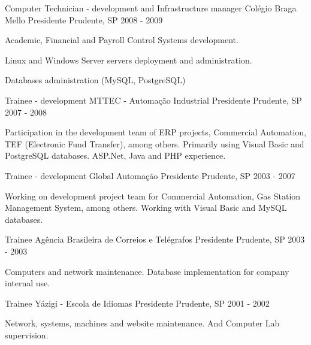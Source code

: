 \begin{cventries}
  \cventry
    {Computer Technician - development and Infrastructure manager} %
    {Colégio Braga Mello} %
    {Presidente Prudente, SP} %
    {2008 - 2009} %
    {
      \begin{cvitems} %
        \item {Academic, Financial and Payroll Control Systems development.}
        \item {Linux and Windows Server servers deployment and administration.}
        \item {Databases administration (MySQL, PostgreSQL)}
      \end{cvitems}
    }


\cventry
{Trainee - development} %
{MTTEC - Automação Industrial} %
{Presidente Prudente, SP} %
{2007 - 2008} %
{
  \begin{cvitems} %
    \item {Participation in the development team of ERP projects, Commercial Automation, TEF (Electronic Fund Transfer), among others. Primarily using Visual Basic and PostgreSQL databases. ASP.Net, Java and PHP experience.}
  \end{cvitems}
}


\cventry
{Trainee - development} %
{Global Automação} %
{Presidente Prudente, SP} %
{2003 - 2007} %
{
  \begin{cvitems} %
    \item {Working on development project team for Commercial Automation, Gas Station Management System, among others. Working with Visual Basic and MySQL databases.}
  \end{cvitems}
}


\cventry
{Trainee} %
{Agência Brasileira de Correios e Telégrafos} %
{Presidente Prudente, SP} %
{2003 - 2003} %
{
  \begin{cvitems} %
    \item {Computers and network maintenance. Database implementation for company internal use.}
  \end{cvitems}
}


\cventry
{Trainee} %
{Yázigi - Escola de Idiomas} %
{Presidente Prudente, SP} %
{2001 - 2002} %
{
  \begin{cvitems} %
    \item {Network, systems, machines and website maintenance. And Computer Lab supervision.}
  \end{cvitems}
}


\end{cventries}

